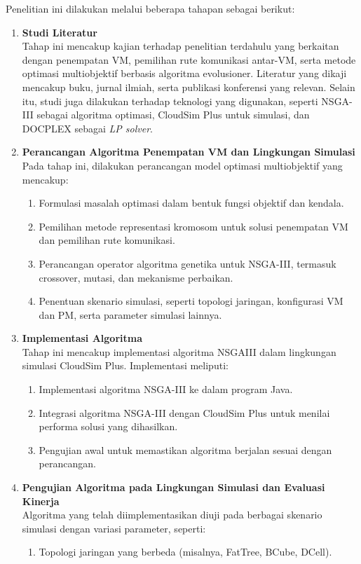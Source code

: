 Penelitian ini dilakukan melalui beberapa tahapan sebagai berikut:

\begin{enumerate}
  \item \textbf{Studi Literatur} \\
    Tahap ini mencakup kajian terhadap penelitian terdahulu yang berkaitan dengan penempatan VM, pemilihan rute komunikasi antar-VM, serta metode optimasi multiobjektif berbasis algoritma evolusioner. Literatur yang dikaji mencakup buku, jurnal ilmiah, serta publikasi konferensi yang relevan. Selain itu, studi juga dilakukan terhadap teknologi yang digunakan, seperti NSGA-III sebagai algoritma optimasi, CloudSim Plus untuk simulasi, dan DOCPLEX sebagai \textit{LP solver}.
    
  \item \textbf{Perancangan Algoritma Penempatan VM dan Lingkungan Simulasi} \\
    Pada tahap ini, dilakukan perancangan model optimasi multiobjektif yang mencakup:
    \begin{enumerate}
     \item Formulasi masalah optimasi dalam bentuk fungsi objektif dan kendala.
        
     \item Pemilihan metode representasi kromosom untuk solusi penempatan VM dan pemilihan rute komunikasi.
        
     \item Perancangan operator algoritma genetika untuk NSGA-III, termasuk crossover, mutasi, dan mekanisme perbaikan.
        
     \item Penentuan skenario simulasi, seperti topologi jaringan, konfigurasi VM dan PM, serta parameter simulasi lainnya.
    \end{enumerate}    
  \item \textbf{Implementasi Algoritma} \\
    Tahap ini mencakup implementasi algoritma NSGAIII dalam lingkungan simulasi CloudSim Plus. Implementasi meliputi:
    \begin{enumerate}
     \item Implementasi algoritma NSGA-III ke dalam program Java.
        
     \item Integrasi algoritma NSGA-III dengan CloudSim Plus untuk menilai performa solusi yang dihasilkan.
        
     \item Pengujian awal untuk memastikan algoritma berjalan sesuai dengan perancangan.
    \end{enumerate}        
  \item \textbf{Pengujian Algoritma pada Lingkungan Simulasi dan Evaluasi Kinerja} \\
    Algoritma yang telah diimplementasikan diuji pada berbagai skenario simulasi dengan variasi parameter, seperti:
    \begin{enumerate}
     \item Topologi jaringan yang berbeda (misalnya, FatTree, BCube, DCell).
        

\end{enumerate}
\end{enumerate}
